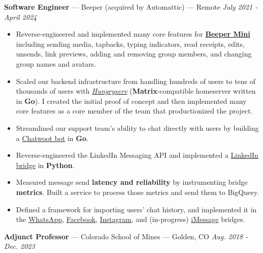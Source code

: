 \documentclass[10pt,letterpaper]{article}
\begin{document}
{\fontsize{11}{0}
\textbf{Software Engineer} --- Beeper (acquired by Automattic) --- Remote}
\hfill \textit{July 2021 - April 2024}
\begin{itemize}
    \item Reverse-engineered and implemented many core features for
        \href{https://blog.beeper.com/p/introducing-beeper-mini-get-blue}{\textbf{Beeper Mini}}
        including sending media, tapbacks, typing indicators, read receipts,
        edits, unsends, link previews, adding and removing group members, and
        changing group names and avatars.
    \item Scaled our backend infrastructure from handling hundreds of users to
        tens of thousands of users with
        \href{https://github.com/sumnerevans/hungryserv-presentation}{\textit{Hungryserv}}
        (\textbf{Matrix}-compatible homeserver written in \textbf{Go}).
        I created the initial proof of concept and then implemented many core
        features as a core member of the team that productionized the project.
    \item Streamlined our support team's ability to chat directly with users by
        building a
        \href{https://github.com/beeper/chatwoot}{Chatwoot bot} in
        \textbf{Go}.
    \item Reverse-engineered the LinkedIn Messaging API and implemented a
        \href{https://github.com/beeper/linkedin}{LinkedIn bridge} in
        \textbf{Python}.
    \item Measured message send \textbf{latency and reliability} by
        instrumenting bridge \textbf{metrics}. Built a service to process those
        metrics and send them to BigQuery.
    \item Defined a framework for importing users' chat history, and
        implemented it in the
        \href{https://github.com/mautrix/whatsapp}{WhatsApp},
        \href{https://github.com/mautrix/facebook}{Facebook},
        \href{https://github.com/mautrix/instagram}{Instagram}, and
        (in-progress) \href{https://github.com/mautrix/imessage}{iMessage} bridges.
\end{itemize}

{\fontsize{11}{0}
\textbf{Adjunct Professor} --- Colorado School of Mines --- Golden, CO}
\hfill \textit{Aug. 2018 - Dec. 2023}
\end{document}
